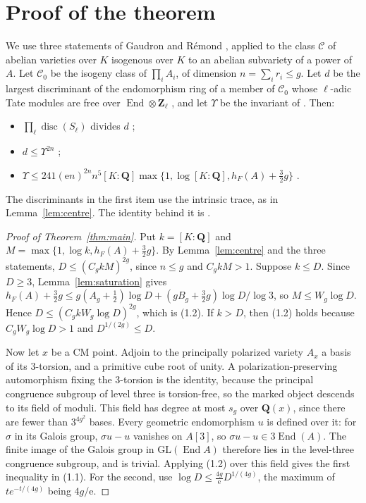 \documentclass[11pt,a4paper]{article}
\theoremstyle{plain}
\theoremstyle{remark}
\newcommand{\Q}{\mathbf Q}
\newcommand{\Z}{\mathbf Z}
\newcommand{\End}{\operatorname{End}}
\newcommand{\disc}{\operatorname{disc}}
\begin{document}
\section{Proof of the theorem}

We use three statements of Gaudron and R\'emond \cite{GR23}, applied to the class $\mathcal C$ of abelian varieties
over $K$ isogenous over $K$ to an abelian subvariety of a power of $A$. Let $\mathcal C_0$ be the isogeny class of
$\prod_iA_i$, of dimension $n=\sum_ir_i\leq g$. Let $d$ be the largest discriminant of the endomorphism ring of a member of $\mathcal C_0$ whose
$\ell$-adic Tate modules are free over $\End\otimes\Z_\ell$ \cite[Notation~1.1]{GR23}, and let $\Upsilon$ be the
invariant of \cite[Notation~1.2]{GR23}. Then:
\begin{itemize}
\item $\prod_\ell\disc(S_\ell)$ divides $d$ \cite[Th\'eor\`eme~1.5(2)]{GR23};
\item $d\leq\Upsilon^{2n}$ \cite[after Notation~1.2]{GR23};
\item $\Upsilon\leq241(\mathrm en)^{2n}n^5[K:\Q]\max\{1,\log[K:\Q],h_F(A)+\frac32g\}$
\cite[Th\'eor\`eme~1.8]{GR23}.
\end{itemize}
The discriminants in the first item use the intrinsic trace, as in Lemma~\ref{lem:centre}. The identity behind it is
\cite[Proposition~13.7]{GR23}.

\begin{proof}[Proof of Theorem~\ref{thm:main}]
Put $k=[K:\Q]$ and $M=\max\{1,\log k,h_F(A)+\frac32g\}$. By Lemma~\ref{lem:centre} and the three statements,
$D\leq(C_gkM)^{2g}$, since $n\leq g$ and $C_gkM>1$. Suppose $k\leq D$. Since $D\geq3$, Lemma~\ref{lem:saturation}
gives $h_F(A)+\frac32g\leq g(A_g+\frac12)\log D+(gB_g+\frac32g)\log D/\log3$, so $M\leq W_g\log D$. Hence
$D\leq(C_gkW_g\log D)^{2g}$, which is (1.2). If $k>D$, then (1.2) holds because $C_gW_g\log D>1$ and
$D^{1/(2g)}\leq D$.

Now let $x$ be a CM point. Adjoin to the principally polarized variety $A_x$ a basis of its $3$-torsion, and a
primitive cube root of unity. A polarization-preserving automorphism fixing the $3$-torsion is the identity, because
the principal congruence subgroup of level three is torsion-free, so the marked object descends to its field of
moduli. This field has degree at most $s_g$ over $\Q(x)$, since there are fewer than $3^{4g^2}$ bases. Every
geometric endomorphism $u$ is defined over it: for $\sigma$ in its Galois group, $\sigma u-u$ vanishes on $A[3]$, so
$\sigma u-u\in3\End(A)$. The finite image of the Galois group in $\mathrm{GL}(\End A)$ therefore lies in the
level-three congruence subgroup, and is trivial. Applying (1.2) over this field gives the first inequality in (1.1).
For the second, use $\log D\leq\frac{4g}{\mathrm e}D^{1/(4g)}$, the maximum of $te^{-t/(4g)}$ being $4g/\mathrm e$.
\end{proof}
\end{document}
